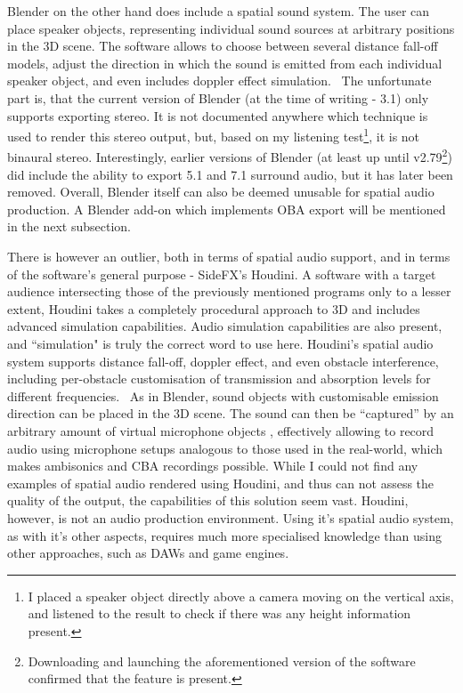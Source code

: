 Blender on the other hand does include a spatial sound system.
The user can place speaker objects, representing individual sound sources at arbitrary positions in the 3D scene.
The software allows to choose between several distance fall-off models, adjust the direction in which the sound is emitted 
from each individual speaker object, and even includes doppler effect simulation.~\cite{blender_manual_audio}
The unfortunate part is, that the current version of Blender (at the time of writing - 3.1) only supports exporting stereo.
It is not documented anywhere which technique is used to render this stereo output, but,
based on my listening test\footnote{
    I placed a speaker object directly above a camera moving on the vertical axis, and listened to the result to
    check if there was any height information present.
}, it is not binaural stereo. Interestingly, earlier versions of Blender
(at least up until v2.79\footnote{
    Downloading and launching the aforementioned version of the software confirmed that the feature is present.
})
did include the ability to export 5.1 and 7.1 surround audio, but it has later been removed.
Overall, Blender itself
can also be deemed unusable for spatial audio production.
A Blender add-on which implements OBA export will be mentioned in the next subsection.

There is however an outlier, both in terms of spatial audio support, 
and in terms of the software's general purpose - SideFX's Houdini.
A software with a target audience intersecting those of the previously mentioned programs only to a lesser extent, 
Houdini takes a completely procedural approach to 3D and includes advanced simulation capabilities.
Audio simulation capabilities are also present, and ``simulation" is truly the correct word to use here.
Houdini's spatial audio system supports distance fall-off, doppler effect, and even obstacle interference,
including per-obstacle customisation of transmission and absorption levels for different frequencies.~\cite{houdini_spatial_chop}\cite{houdini_acoustic_chop}
As in Blender, sound objects with customisable emission direction can be placed in the 3D scene. \cite{houdini_sound_object}
The sound can then be ``captured'' by an arbitrary amount of virtual microphone objects \cite{houdini_microphone_object}, effectively allowing
to record audio using microphone setups analogous to those used in the real-world, which makes ambisonics and CBA recordings possible.
While I could not find any examples of spatial audio rendered using Houdini, and thus can not assess the quality of the output,
the capabilities of this solution seem vast.
Houdini, however, is not an audio production environment. Using it's spatial audio system, as with it's other aspects,
requires much more specialised knowledge than using other approaches, such as DAWs and game engines.


